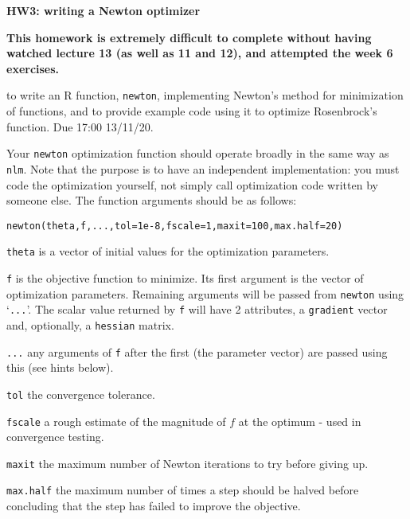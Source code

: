 \documentclass[10pt] {article}
\begin{document}
\begin{center} {\bf \Large HW3: writing a Newton optimizer}\end{center}

\begin{center}
{\bf This homework is extremely difficult to complete without having watched lecture 13 (as well as 11 and 12), and attempted the week 6 exercises.} 
\end{center}
\bigskip

 to write an R function, {\tt newton}, implementing Newton's method for minimization of functions, and to provide example code using it to optimize Rosenbrock's function. Due 17:00 13/11/20. 

\bigskip

 Your {\tt newton} optimization function should operate broadly in the same way as {\tt nlm}. Note that the purpose is to have an independent implementation: you must code the optimization yourself, not simply call optimization code written by someone else. The function arguments should be as follows:
\begin{verbatim}
newton(theta,f,...,tol=1e-8,fscale=1,maxit=100,max.half=20)
\end{verbatim}
\begin{trivlist}
\item {\tt theta} is a vector of initial values for the optimization parameters.
\item {\tt f} is the objective function to minimize. Its first argument is the vector of optimization parameters. Remaining arguments will be passed from {\tt newton} using `\verb+...+'. The scalar value returned by {\tt f} will have 2 attributes, a {\tt gradient} vector and, optionally, a {\tt hessian} matrix.
\item \verb+...+ any arguments of {\tt f} after the first (the parameter vector) are passed using this (see hints below).
\item {\tt tol} the convergence tolerance.
\item {\tt fscale} a rough estimate of the magnitude of $f$ at the optimum - used in convergence testing.
\item {\tt maxit} the maximum number of Newton iterations to try before giving up.
\item {\tt max.half} the maximum number of times a step should be halved before concluding that the step has failed to improve the objective. 
\end{trivlist} 
\end{document}
